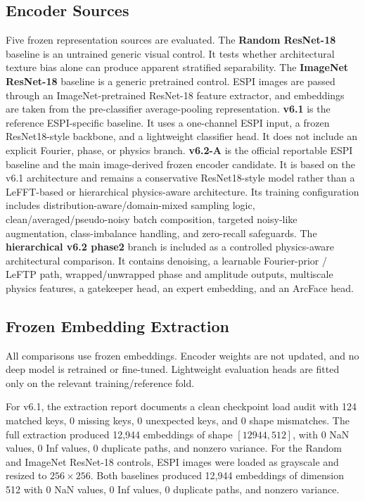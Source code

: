 \documentclass[review,3p,times]{elsarticle}
\begin{document}
\subsection{Encoder Sources}
Five frozen representation sources are evaluated.
The \textbf{Random ResNet-18} baseline is an untrained generic visual control. It tests whether architectural texture bias alone can produce apparent stratified separability.
The \textbf{ImageNet ResNet-18} baseline is a generic pretrained control. ESPI images are passed through an ImageNet-pretrained ResNet-18 feature extractor, and embeddings are taken from the pre-classifier average-pooling representation.
\textbf{v6.1} is the reference ESPI-specific baseline. It uses a one-channel ESPI input, a frozen ResNet18-style backbone, and a lightweight classifier head. It does not include an explicit Fourier, phase, or physics branch.
\textbf{v6.2-A} is the official reportable ESPI baseline and the main image-derived frozen encoder candidate. It is based on the v6.1 architecture and remains a conservative ResNet18-style model rather than a LeFFT-based or hierarchical physics-aware architecture. Its training configuration includes distribution-aware/domain-mixed sampling logic, clean/averaged/pseudo-noisy batch composition, targeted noisy-like augmentation, class-imbalance handling, and zero-recall safeguards.
The \textbf{hierarchical v6.2 phase2} branch is included as a controlled physics-aware architectural comparison. It contains denoising, a learnable Fourier-prior / LeFTP path, wrapped/unwrapped phase and amplitude outputs, multiscale physics features, a gatekeeper head, an expert embedding, and an ArcFace head.

\subsection{Frozen Embedding Extraction}
All comparisons use frozen embeddings. Encoder weights are not updated, and no deep model is retrained or fine-tuned. Lightweight evaluation heads are fitted only on the relevant training/reference fold.

For v6.1, the extraction report documents a clean checkpoint load audit with 124 matched keys, 0 missing keys, 0 unexpected keys, and 0 shape mismatches. The full extraction produced 12,944 embeddings of shape $[12944, 512]$, with 0 NaN values, 0 Inf values, 0 duplicate paths, and nonzero variance.
For the Random and ImageNet ResNet-18 controls, ESPI images were loaded as grayscale and resized to $256 \times 256$. Both baselines produced 12,944 embeddings of dimension 512 with 0 NaN values, 0 Inf values, 0 duplicate paths, and nonzero variance.
\end{document}
